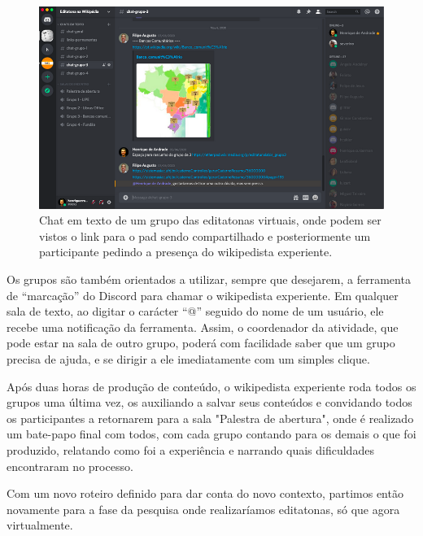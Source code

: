 \begin{figure}[H]
    \centering
    \includegraphics[width=1\textwidth]{Images/discord_full.png}
    \caption{Chat em texto de um grupo das editatonas virtuais, onde podem ser vistos o link para o pad sendo compartilhado e posteriormente um participante pedindo a presença do wikipedista experiente.}
    \label{fig:discord_chat}
\end{figure}

Os grupos são também orientados a utilizar, sempre que desejarem, a ferramenta de ``marcação'' do Discord para chamar o wikipedista experiente. Em qualquer sala de texto, ao digitar o carácter ``@'' seguido do nome de um usuário, ele recebe uma notificação da ferramenta. Assim, o coordenador da atividade, que pode estar na sala de outro grupo, poderá com facilidade saber que um grupo precisa de ajuda, e se dirigir a ele imediatamente com um simples clique.

Após duas horas de produção de conteúdo, o wikipedista experiente roda todos os grupos uma última vez, os auxiliando a salvar seus conteúdos e convidando todos os participantes a retornarem para a sala "Palestra de abertura", onde é realizado um bate-papo final com todos, com cada grupo contando para os demais o que foi produzido, relatando como foi a experiência e narrando quais dificuldades encontraram no processo.

Com um novo roteiro definido para dar conta do novo contexto, partimos então novamente para a fase da pesquisa onde realizaríamos editatonas, só que agora virtualmente.